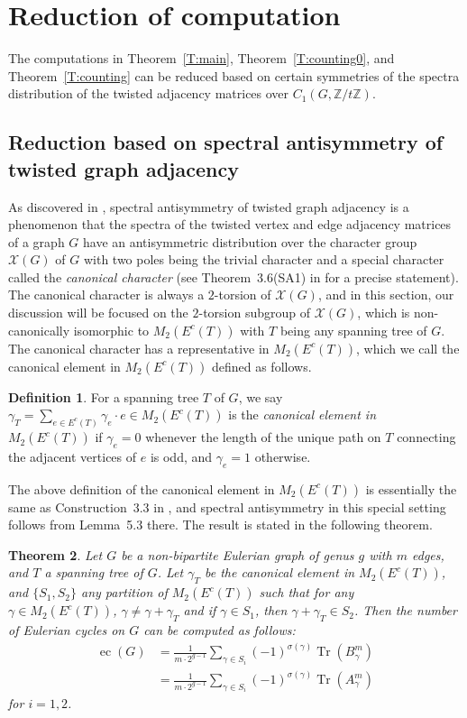 \documentclass[11pt]{amsart}
\theoremstyle{plain}
\newtheorem{theorem}{Theorem}[section]
\theoremstyle{definition}
\newtheorem{definition}[theorem]{Definition}
\newcommand{\mbbZ}{{\mathbb Z}}
\newcommand{\mcalX}{{\mathcal X}}
\DeclareMathOperator{\ec}{\operatorname{ec}}
\DeclareMathOperator{\trace}{\operatorname{Tr}}
\numberwithin{equation}{section}
\begin{document}
\section{Reduction of computation}\label{S:reduction}
The computations in Theorem~\ref{T:main}, Theorem~\ref{T:counting0}, and Theorem~\ref{T:counting} can be reduced based on certain symmetries of the spectra distribution of the twisted adjacency matrices over $C_1(G,\mbbZ/t\mbbZ)$. 



\subsection{Reduction based on spectral antisymmetry of twisted graph adjacency}
As discovered in \cite{LR2024spectral}, spectral antisymmetry of twisted graph adjacency is a phenomenon that the spectra of the twisted vertex and edge adjacency matrices of a graph $G$ have an antisymmetric distribution over the character group $\mcalX(G)$ of $G$ with two poles being the trivial character and a special character called the \emph{canonical character} (see Theorem~3.6(SA1) in \cite{LR2024spectral} for a precise statement). The canonical character is always a  $2$-torsion of $\mcalX(G)$, and in this section,  our discussion will be focused on the $2$-torsion subgroup of $\mcalX(G)$, which is non-canonically isomorphic to $M_2(E^c(T) )$ with $T$ being any spanning tree of $G$. The canonical character has a representative in $M_2(E^c(T) )$, which we call the canonical element in $M_2(E^c(T))$ defined as follows. 

\begin{definition}
For a spanning tree $T$ of $G$,  we say $\gamma_T=\sum_{e\in E^c(T)}\gamma_e\cdot e \in M_2(E^c(T) )$ is the \emph{canonical element in $M_2(E^c(T))$} if $\gamma_e=0$ whenever the length of the unique path on $T$ connecting the adjacent vertices of $e$ is odd, and $\gamma_e=1$ otherwise. 
\end{definition}


The above definition of the canonical element in $M_2(E^c(T))$ is essentially the same as Construction~3.3 in \cite{LR2024spectral}, and spectral antisymmetry in this special setting follows from Lemma~5.3 there. The result is stated in the following theorem. 


\begin{theorem} \label{T:red_anti}
Let $G$ be a non-bipartite Eulerian graph of genus $g$ with $m$ edges, and $T$ a spanning tree of $G$. Let  $\gamma_T$ be the canonical element in $M_2(E^c(T) )$, and $\{S_1,S_2\}$ any partition of $M_2(E^c(T) )$ such that for any  $\gamma\in M_2(E^c(T) )$, $\gamma\neq \gamma+\gamma_T$ and if $\gamma\in S_1$, then $\gamma+\gamma_T\in S_2$. Then the number of Eulerian cycles on $G$ can be computed as follows:
\begin{align*}
\ec(G) &= \frac{1}{m\cdot 2^{g-1}}\sum_{\gamma\in S_i}(-1)^{\sigma(\gamma)}\trace\left(B_\gamma^m\right) \\
&= \frac{1}{m\cdot 2^{g-1}}\sum_{\gamma\in S_i}(-1)^{\sigma(\gamma)}\trace\left(A_\gamma^m\right)
\end{align*}
for $i=1,2$. 
\end{theorem}
\end{document}
